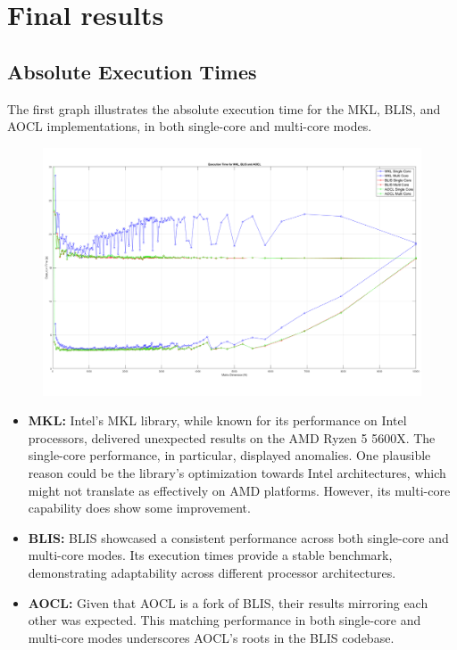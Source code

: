 \section{Final results}

\subsection{Absolute Execution Times}

The first graph illustrates the absolute execution time for the MKL, BLIS, and AOCL implementations, in both single-core and multi-core modes.

\begin{figure}[h!] %
    \centering
    \includegraphics[width=\linewidth]{Figures/Imagenes/Final1.png} %
    \caption{}
\end{figure}

\begin{itemize}
    \item \textbf{MKL:} Intel's MKL library, while known for its performance on Intel processors, delivered unexpected results on the AMD Ryzen 5 5600X. The single-core performance, in particular, displayed anomalies. One plausible reason could be the library's optimization towards Intel architectures, which might not translate as effectively on AMD platforms. However, its multi-core capability does show some improvement.
    
    \item \textbf{BLIS:} BLIS showcased a consistent performance across both single-core and multi-core modes. Its execution times provide a stable benchmark, demonstrating adaptability across different processor architectures.
    
    \item \textbf{AOCL:} Given that AOCL is a fork of BLIS, their results mirroring each other was expected. This matching performance in both single-core and multi-core modes underscores AOCL's roots in the BLIS codebase.
\end{itemize}



